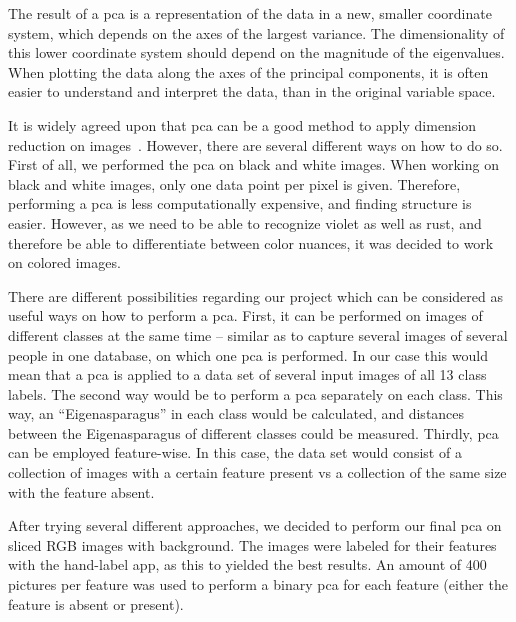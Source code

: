 The result of a \acrshort{pca} is a representation of the data in a new, smaller coordinate system, which depends on the axes of the largest variance. The dimensionality of this lower coordinate system should depend on the magnitude of the eigenvalues. When plotting the data along the axes of the principal components, it is often easier to understand and interpret the data, than in the original variable space.

It is widely agreed upon that \acrshort{pca} can be a good method to apply dimension reduction on images~\citep{turk1991face,lata2009}.
However, there are several different ways on how to do so. First of all, we performed the \acrshort{pca} on black and white images. When working on black and white images, only one data point per pixel is given. Therefore, performing a \acrshort{pca} is less computationally expensive, and finding structure is easier. However, as we need to be able to recognize violet as well as rust, and therefore be able to differentiate between color nuances, it was decided to work on colored images.

\bigskip
There are different possibilities regarding our project which can be considered as useful ways on how to perform a \acrshort{pca}. First, it can be performed on images of different classes at the same time – similar as to capture several images of several people in one database, on which one \acrshort{pca} is performed. In our case this would mean that a \acrshort{pca} is applied to a data set of several input images of all 13 class labels. The second way would be to perform a \acrshort{pca} separately on each class. This way, an \enquote{Eigenasparagus} in each class would be calculated, and distances between the Eigenasparagus of different classes could be measured. Thirdly, \acrshort{pca} can be employed feature-wise. In this case, the data set would consist of a collection of images with a certain feature present vs a collection of the same size with the feature absent.

\bigskip
After trying several different approaches, we decided to perform our final \acrshort{pca} on sliced RGB images with background. The images were labeled for their features with the hand-label app, as this to yielded the best results. An amount of 400 pictures per feature was used to perform a binary \acrshort{pca} for each feature (either the feature is absent or present).

